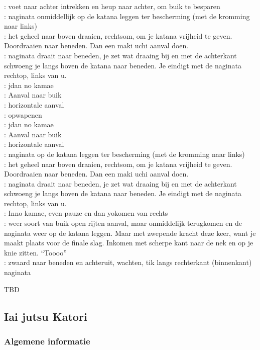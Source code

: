 \pA: voet naar achter intrekken en heup naar achter, om buik te besparen\\
\pB: naginata onmiddellijk op de katana leggen ter bescherming (met de kromming naar links)\\
\pA: het geheel naar boven draaien, rechtsom, om je katana vrijheid te geven. Doordraaien naar beneden. Dan een maki uchi aanval doen.\\
\pB: naginata draait naar beneden, je zet wat draaing bij en met de achterkant schwoeng je langs boven de katana naar beneden. Je eindigt met de naginata rechtop, links van u.\\
\pA: jdan no kamae\\
\pB: Aanval naar buik\\
\pA: horizontale aanval\\ 
\pB: opwapenen\\
\pA: jdan no kamae\\
\pB: Aanval naar buik\\
\pA: horizontale aanval\\ 
\pB: naginata op de katana leggen ter bescherming (met de kromming naar links)\\
\pA: het geheel naar boven draaien, rechtsom, om je katana vrijheid te geven. Doordraaien naar beneden. Dan een maki uchi aanval doen.\\
\pB: naginata draait naar beneden, je zet wat draaing bij en met de achterkant schwoeng je langs boven de katana naar beneden. Je eindigt met de naginata rechtop, links van u.\\
\pA: Inno kamae, even pauze en dan yokomen van rechts\\
\pB: weer soort van buik open rijten aanval, maar onmiddelijk terugkomen en de naginata weer op de katana leggen. Maar met zwepende kracht deze keer, want je maakt plaats voor de finale slag. Inkomen met scherpe kant naar de nek en op je knie zitten. ``Toooo''\\
\pA: zwaard naar beneden en achteruit, wachten, tik langs rechterkant (binnenkant) naginata

TBD

\subsection{Iai jutsu Katori}

\subsubsection{Algemene informatie}

